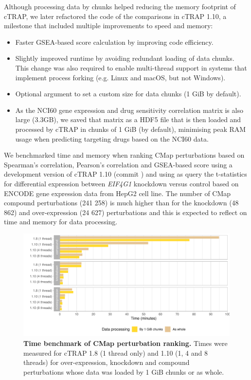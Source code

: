 Although processing data by chunks helped reducing the memory footprint of cTRAP, we later refactored the code of the comparisons in cTRAP 1.10, a milestone that included multiple improvements to speed and memory:

\begin{itemize}
	\item Faster GSEA-based score calculation by improving code efficiency.
	\item Slightly improved runtime by avoiding redundant loading of data chunks. This change was also required to enable multi-thread support in systems that implement process forking (e.g. Linux and macOS, but not Windows).
	\item Optional argument to set a custom size for data chunks (1 GiB by default).
	\item As the NCI60 gene expression and drug sensitivity correlation matrix is also large (3.3GB), we saved that matrix as a HDF5 file that is then loaded and processed by cTRAP in chunks of 1 GiB (by default), minimising peak RAM usage when predicting targeting drugs based on the NCI60 data.
\end{itemize}

We benchmarked time and memory when ranking CMap perturbations based on Spearman's correlation, Pearson's correlation and GSEA-based score using a development version of cTRAP 1.10 (commit ) and using as query the t-statistics for differential expression between \emph{EIF4G1} knockdown versus control based on ENCODE gene expression data from HepG2 cell line. The number of CMap compound perturbations (241 258) is much higher than for the knockdown (48 862) and over-expression (24 627) perturbations and this is expected to reflect on time and memory for data processing.

\begin{figure}[!b]
  \includegraphics[width=\textwidth]{images/ctrap/ranking-time}
  \centering
  \caption[Time benchmark of CMap perturbation ranking]{\textbf{Time benchmark of CMap perturbation ranking.} Times were measured for cTRAP 1.8 (1 thread only) and 1.10 (1, 4 and 8 threads) for over-expression, knockdown and compound perturbations whose data was loaded by 1 GiB chunks or as whole.}
  \label{fig:cmap-ranking-time}
\end{figure}

